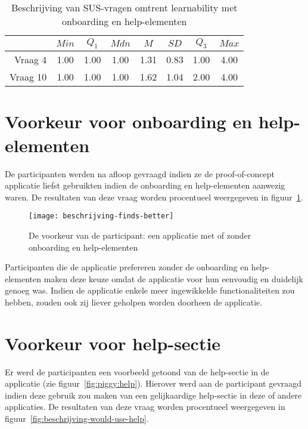 \begin{table}[h]
	\centering
	\begin{tabular}{r|ccccccc}
		& $Min$ & $Q_1$ & $Mdn$ & $M$ & $SD$ & $Q_3$ & $Max$ \\ \hline
		Vraag 4 & 1.00 & 1.00 & 1.00 & 1.31 & 0.83 & 1.00 & 4.00 \\
		Vraag 10 & 1.00 & 1.00 & 1.00 & 1.62 & 1.04 & 2.00 & 4.00
	\end{tabular}
	\caption{Beschrijving van SUS-vragen omtrent learnability met onboarding en help-elementen}
	\label{tab:beschrijving-sus-learnability-2}
\end{table}

\section{Voorkeur voor onboarding en help-elementen}
\label{sec:voorkeur-onboarding}

De participanten werden na afloop gevraagd indien ze de proof-of-concept applicatie liefst gebruikten indien de onboarding en help-elementen aanwezig waren. De resultaten van deze vraag worden procentueel weergegeven in figuur~\ref{fig:beschrijving-finds-better}.

\begin{figure}[h]
    \centering
    \texttt{[image: beschrijving-finds-better]}
    \caption{De voorkeur van de participant: een applicatie met of zonder onboarding en help-elementen}
    \label{fig:beschrijving-finds-better}
\end{figure}

Participanten die de applicatie prefereren zonder de onboarding en help-elementen maken deze keuze omdat de applicatie voor hun eenvoudig en duidelijk genoeg was. Indien de applicatie enkele meer ingewikkelde functionaliteiten zou hebben, zouden ook zij liever geholpen worden doorheen de applicatie.

\section{Voorkeur voor help-sectie}
\label{sec:voorkeur-help}

Er werd de participanten een voorbeeld getoond van de help-sectie in de applicatie (zie figuur~\ref{fig:piggy:help}). Hierover werd aan de participant gevraagd indien deze gebruik zou maken van een gelijkaardige help-sectie in deze of andere applicaties. De resultaten van deze vraag worden procentueel weergegeven in figuur~\ref{fig:beschrijving-would-use-help}.

